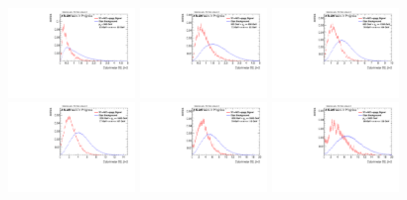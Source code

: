 \begin{figure}[H]
\bigskip
\includegraphics[width=0.3\textwidth]{sascha_input/Appendix/Distributions/w/distributions/beta2/h_recoJet_D2_2_bin1.pdf} \hspace{1mm}
\includegraphics[width=0.3\textwidth]{sascha_input/Appendix/Distributions/w/distributions/beta2/h_recoJet_D2_2_bin2.pdf} \hspace{1mm}
\includegraphics[width=0.3\textwidth]{sascha_input/Appendix/Distributions/w/distributions/beta2/h_recoJet_D2_2_bin3.pdf} 
\bigskip
\includegraphics[width=0.3\textwidth]{sascha_input/Appendix/Distributions/w/distributions/beta2/h_recoJet_D2_2_bin4.pdf} \hspace{1mm}
\includegraphics[width=0.3\textwidth]{sascha_input/Appendix/Distributions/w/distributions/beta2/h_recoJet_D2_2_bin5.pdf} \hspace{1mm}
\includegraphics[width=0.3\textwidth]{sascha_input/Appendix/Distributions/w/distributions/beta2/h_recoJet_D2_2_bin6.pdf}

\end{figure}
